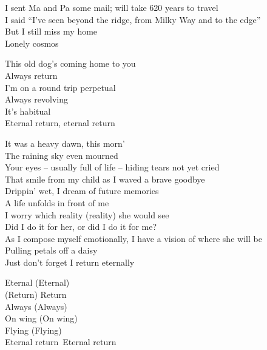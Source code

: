
I sent Ma and Pa some mail; will take 620 years to travel \\
I said ``I've seen beyond the ridge, from Milky Way and to the edge'' \\
But I still miss my home \\
Lonely cosmos \\




This old dog's coming home to you \\
Always return \\
I'm on a round trip perpetual \\
Always revolving \\
It's habitual \\
Eternal return, eternal return \\


It was a heavy dawn, this morn' \\
The raining sky even mourned \\
Your eyes -- usually full of life -- hiding tears not yet cried \\
That smile from my child as I waved a brave goodbye \\
Drippin' wet, I dream of future memories \\
A life unfolds in front of me \\

I worry which reality (reality) she would see \\
Did I do it for her, or did I do it for me? \\
As I compose myself emotionally, I have a vision of where she will be \\
Pulling petals off a daisy \\
Just don't forget I return eternally \\


Eternal (Eternal) \\
(Return) Return \\
Always (Always) \\
On wing (On wing) \\
Flying (Flying) \\
Eternal return\
Eternal return \\

